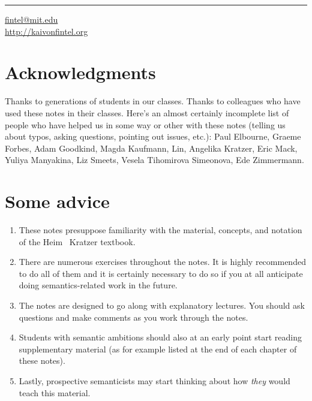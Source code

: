 \plainbreak{1}

\href{mailto:fintel@mit.edu}{fintel@mit.edu}\\
\url{http://kaivonfintel.org} 

\cleardoublepage

\null
\vfill \ba 

\section*{Acknowledgments}

Thanks to generations of students in our classes. Thanks to colleagues
who have used these notes in their classes. Here's an almost certainly
incomplete list of people who have helped us in some way or other with
these notes (telling us about typos, asking questions, pointing out
issues, etc.): Paul Elbourne, Graeme Forbes, Adam Goodkind, Magda
Kaufmann, Lin, Angelika Kratzer, Eric Mack, Yuliya Manyakina, Liz
Smeets, Vesela Tihomirova Simeonova, Ede Zimmermann.

\section*{Some advice}
\begin{enumerate}
\item These notes presuppose familiarity with the material, concepts,
  and notation of the Heim \amp\ Kratzer textbook.
\item There are numerous exercises throughout the notes. It is highly
  recommended to do all of them and it is certainly necessary to do so
  if you at all anticipate doing semantics-related work in the future.
\item The notes are designed to go along with explanatory lectures.
  You should ask questions and make comments as you work through the
  notes.
\item Students with semantic ambitions should also at an early point
  start reading supplementary material (as for example listed at the
  end of each chapter of these notes).
\item Lastly, prospective semanticists may start thinking about how
  \emph{they} would teach this material.
\end{enumerate}

\ab 
\vfill\null

\newpage\hbox{}
\vfill{\scshape{}}
\vfill\hbox{}\thispagestyle{cleared}